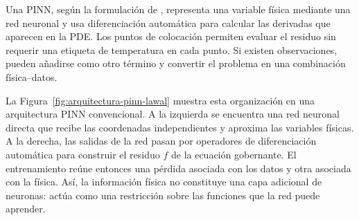 \documentclass[11pt,a4paper,oneside]{report}
\begin{document}
Una PINN, según la formulación de \textcite[686--690]{raissi2019}, representa una variable física mediante una red neuronal y usa diferenciación automática para calcular las derivadas que aparecen en la PDE. Los puntos de colocación permiten evaluar el residuo sin requerir una etiqueta de temperatura en cada punto. Si existen observaciones, pueden añadirse como otro término y convertir el problema en una combinación física--datos.

La Figura~\ref{fig:arquitectura-pinn-lawal} muestra esta organización en una arquitectura PINN convencional. A la izquierda se encuentra una red neuronal directa que recibe las coordenadas independientes y aproxima las variables físicas. A la derecha, las salidas de la red pasan por operadores de diferenciación automática para construir el residuo $f$ de la ecuación gobernante. El entrenamiento reúne entonces una pérdida asociada con los datos y otra asociada con la física. Así, la información física no constituye una capa adicional de neuronas: actúa como una restricción sobre las funciones que la red puede aprender.
\end{document}
